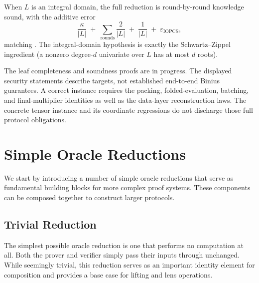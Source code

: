 \begin{theorem}
  \label{thm:ring_switching_soundness}
  When $L$ is an integral domain, the full reduction is round-by-round knowledge sound, with the
  additive error
  \[
    \frac{\kappa}{\lvert L\rvert} \;+\; \sum_{\text{rounds}} \frac{2}{\lvert L\rvert} \;+\;
    \frac{1}{\lvert L\rvert} \;+\; \varepsilon_{\mathrm{IOPCS}},
  \]
  matching \cite[\S3.1--3.2]{DP24}. The integral-domain hypothesis is exactly the Schwartz--Zippel
  ingredient (a nonzero degree-$d$ univariate over $L$ has at most $d$ roots).
\end{theorem}

\noindent The leaf completeness and soundness proofs are in progress. The displayed security
statements describe targets, not established end-to-end Binius guarantees. A correct instance
requires the packing, folded-evaluation, batching, and final-multiplier identities as well as the
data-layer reconstruction laws. The concrete tensor instance and its coordinate regressions do
not discharge those full protocol obligations.


\section{Simple Oracle Reductions}

We start by introducing a number of simple oracle reductions that serve as fundamental building blocks for more complex proof systems. These components can be composed together to construct larger protocols.

\subsection{Trivial Reduction}

The simplest possible oracle reduction is one that performs no computation at all. Both the prover and verifier simply pass their inputs through unchanged. While seemingly trivial, this reduction serves as an important identity element for composition and provides a base case for lifting and lens operations.

